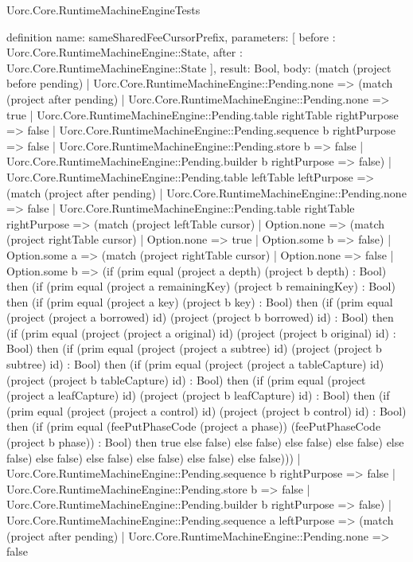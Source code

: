 \begin{lexlean}{Uorc.Core.RuntimeMachineEngineTests}
\begin{semanticmodule}
definition{
  name: sameSharedFeeCursorPrefix,
  parameters: [
    before : Uorc.Core.RuntimeMachineEngine::State,
    after : Uorc.Core.RuntimeMachineEngine::State
  ],
  result: Bool,
  body: (match (project before pending)
    | Uorc.Core.RuntimeMachineEngine::Pending.none => (match (project after pending)
      | Uorc.Core.RuntimeMachineEngine::Pending.none => true
      | Uorc.Core.RuntimeMachineEngine::Pending.table rightTable rightPurpose => false
      | Uorc.Core.RuntimeMachineEngine::Pending.sequence b rightPurpose => false
      | Uorc.Core.RuntimeMachineEngine::Pending.store b => false
      | Uorc.Core.RuntimeMachineEngine::Pending.builder b rightPurpose => false)
    | Uorc.Core.RuntimeMachineEngine::Pending.table leftTable leftPurpose => (match (project after pending)
      | Uorc.Core.RuntimeMachineEngine::Pending.none => false
      | Uorc.Core.RuntimeMachineEngine::Pending.table rightTable rightPurpose => (match (project leftTable cursor)
        | Option.none => (match (project rightTable cursor)
          | Option.none => true
          | Option.some b => false)
        | Option.some a => (match (project rightTable cursor)
          | Option.none => false
          | Option.some b => (if (prim equal (project a depth) (project b depth) : Bool) then (if (prim equal (project a remainingKey) (project b remainingKey) : Bool) then (if (prim equal (project a key) (project b key) : Bool) then (if (prim equal (project (project a borrowed) id) (project (project b borrowed) id) : Bool) then (if (prim equal (project (project a original) id) (project (project b original) id) : Bool) then (if (prim equal (project (project a subtree) id) (project (project b subtree) id) : Bool) then (if (prim equal (project (project a tableCapture) id) (project (project b tableCapture) id) : Bool) then (if (prim equal (project (project a leafCapture) id) (project (project b leafCapture) id) : Bool) then (if (prim equal (project (project a control) id) (project (project b control) id) : Bool) then (if (prim equal (feePutPhaseCode (project a phase)) (feePutPhaseCode (project b phase)) : Bool) then true else false) else false) else false) else false) else false) else false) else false) else false) else false) else false)))
      | Uorc.Core.RuntimeMachineEngine::Pending.sequence b rightPurpose => false
      | Uorc.Core.RuntimeMachineEngine::Pending.store b => false
      | Uorc.Core.RuntimeMachineEngine::Pending.builder b rightPurpose => false)
    | Uorc.Core.RuntimeMachineEngine::Pending.sequence a leftPurpose => (match (project after pending)
      | Uorc.Core.RuntimeMachineEngine::Pending.none => false
}
\end{semanticmodule}
\end{lexlean}
